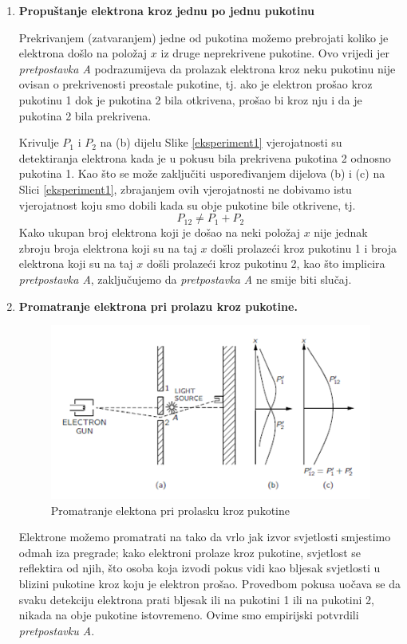 \documentclass[twoside]{article}
\begin{document}
\begin{enumerate}[label={(\arabic*)}]
    \item \textbf{Propuštanje elektrona kroz jednu po jednu pukotinu}

Prekrivanjem (zatvaranjem) jedne od pukotina možemo prebrojati koliko je elektrona došlo na položaj $x$ iz druge neprekrivene pukotine. Ovo vrijedi jer \emph{pretpostavka A}  podrazumijeva da prolazak elektrona kroz neku pukotinu nije ovisan o prekrivenosti preostale pukotine, tj. ako je elektron prošao kroz pukotinu 1 dok je pukotina 2 bila otkrivena, prošao bi kroz nju i da je pukotina 2 bila prekrivena.

Krivulje $P_1$ i $P_2$ na (b) dijelu Slike \ref{eksperiment1} vjerojatnosti su detektiranja elektrona kada je u pokusu bila prekrivena pukotina 2 odnosno pukotina 1. Kao što se može zaključiti uspoređivanjem dijelova (b) i (c) na Slici \ref{eksperiment1}, zbrajanjem ovih vjerojatnosti ne dobivamo istu vjerojatnost koju smo dobili kada su obje pukotine bile otkrivene, tj.
\[ P_{12} \neq P_1 + P_2\]
Kako ukupan broj elektrona koji je došao na neki položaj $x$ nije jednak zbroju broja elektrona koji su na taj $x$ došli prolazeći kroz pukotinu 1 i broja elektrona koji su na taj $x$ došli prolazeći kroz pukotinu 2, kao što implicira \emph{pretpostavka A}, zaključujemo da \emph{pretpostavka A} ne smije biti slučaj.
    \item \textbf{Promatranje elektrona pri prolazu kroz pukotine.}

\begin{figure}[!htb]
    \centering
    \includegraphics{eksperiment-2}
    \caption{Promatranje elektona pri prolasku kroz pukotine \cite{Cushing2006}}
    \label{eksperiment2}
    \end{figure}

Elektrone možemo promatrati na tako da vrlo jak izvor svjetlosti smjestimo odmah iza pregrade; kako elektroni prolaze kroz pukotine, svjetlost se reflektira od njih, što osoba koja izvodi pokus vidi kao bljesak svjetlosti u blizini pukotine kroz koju je elektron prošao. Provedbom pokusa uočava se da svaku detekciju elektrona prati bljesak ili na pukotini 1 ili na pukotini 2, nikada na obje pukotine istovremeno. Ovime smo empirijski potvrdili \emph{pretpostavku A}. 


\end{enumerate}
\end{document}
